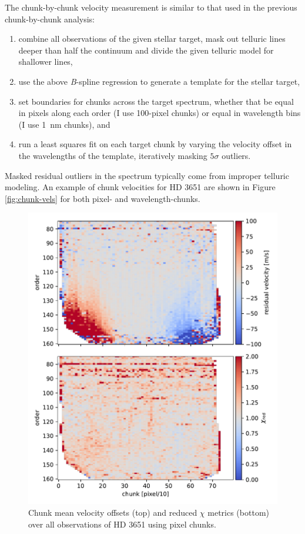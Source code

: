 The chunk-by-chunk velocity measurement is similar to that used in the previous chunk-by-chunk analysis:
\begin{enumerate}
    \item combine all observations of the given stellar target, mask out telluric lines deeper than half the continuum and divide the given telluric model for shallower lines,
    \item use the above \textit{B}-spline regression to generate a template for the stellar target,
    \item set boundaries for chunks across the target spectrum, whether that be equal in pixels along each order (I use 100-pixel chunks) or equal in wavelength bins (I use 1~nm chunks), and
    \item run a least squares fit on each target chunk by varying the velocity offset in the wavelengths of the template, iteratively masking $5\sigma$ outliers.
\end{enumerate}
Masked residual outliers in the spectrum typically come from improper telluric modeling. An example of chunk velocities for HD 3651 are shown in Figure \ref{fig:chunk-vels} for both pixel- and wavelength-chunks.

\begin{figure}
    \centering
    \includegraphics[width=\textwidth]{figures-5/pixel-chunk-resid.pdf}
    \caption[Forward model chunk velocity offsets and reduced $\chi$ metrics -- pixel chunks]{Chunk mean velocity offsets (top) and reduced $\chi$ metrics (bottom) over all observations of HD 3651 using pixel chunks.}
    \label{fig:pixel-chunk-resid}
\end{figure}

